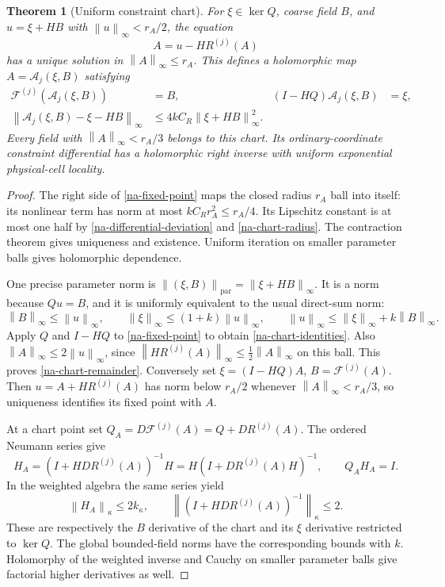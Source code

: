 \documentclass[11pt]{article}
\newtheorem{theorem}{Theorem}[section]
\theoremstyle{remark}
\newcommand{\norm}[1]{\left\|#1\right\|}
\begin{document}
\begin{theorem}[Uniform constraint chart]
\label{na-chart-theorem}
For $\xi\in\ker Q$, coarse field $B$, and
$u=\xi+HB$ with $\norm{u}_\infty<r_A/2$, the equation
\begin{equation}
 A=u-HR^{(j)}(A)
 \label{na-fixed-point}
\end{equation}
has a unique solution in $\norm{A}_\infty\le r_A$. This defines
a holomorphic map $A=\mathcal A_j(\xi,B)$ satisfying
\begin{align}
 \mathcal F^{(j)}(\mathcal A_j(\xi,B))&=B,
 & (I-HQ)\mathcal A_j(\xi,B)&=\xi,
 \label{na-chart-identities}\\
 \norm{\mathcal A_j(\xi,B)-\xi-HB}_\infty
   &\le4kC_R\norm{\xi+HB}_\infty^2.
 \label{na-chart-remainder}
\end{align}
Every field with $\norm{A}_\infty<r_A/3$ belongs to this chart.
Its ordinary-coordinate constraint differential has a holomorphic
right inverse with uniform exponential physical-cell locality.
\end{theorem}

\begin{proof}
The right side of \eqref{na-fixed-point} maps the closed radius
$r_A$ ball into itself: its nonlinear term has norm at most
$kC_Rr_A^2\le r_A/4$. Its Lipschitz constant is at most one half
by \eqref{na-differential-deviation} and \eqref{na-chart-radius}.
The contraction theorem gives uniqueness and existence. Uniform
iteration on smaller parameter balls gives holomorphic dependence.

One precise parameter norm is
$\norm{(\xi,B)}_{\mathrm{par}}=\norm{\xi+HB}_\infty$.
It is a norm because $Qu=B$, and it is uniformly equivalent to
the usual direct-sum norm:
\[
 \norm{B}_\infty\le\norm{u}_\infty,\qquad
 \norm{\xi}_\infty\le(1+k)\norm{u}_\infty,\qquad
 \norm{u}_\infty\le\norm{\xi}_\infty+k\norm{B}_\infty.
\]
Apply $Q$ and $I-HQ$ to \eqref{na-fixed-point} to obtain
\eqref{na-chart-identities}. Also
$\norm{A}_\infty\le2\norm{u}_\infty$, since
$\norm{HR^{(j)}(A)}_\infty\le\frac12\norm{A}_\infty$ on this
ball. This proves \eqref{na-chart-remainder}. Conversely set
$\xi=(I-HQ)A$, $B=\mathcal F^{(j)}(A)$. Then
$u=A+HR^{(j)}(A)$ has norm below $r_A/2$ whenever
$\norm{A}_\infty<r_A/3$, so uniqueness identifies its fixed point
with $A$.

At a chart point set
$Q_A=D\mathcal F^{(j)}(A)=Q+DR^{(j)}(A)$. The ordered Neumann
series give
\begin{equation}
 H_A=(I+H DR^{(j)}(A))^{-1}H
      =H(I+DR^{(j)}(A)H)^{-1},\qquad Q_AH_A=I.
 \label{na-chart-right-inverse}
\end{equation}
In the weighted algebra the same series yield
\begin{equation}
 \norm{H_A}_\kappa\le2k_\kappa,
 \qquad \norm{(I+H DR^{(j)}(A))^{-1}}_\kappa\le2.
 \label{na-chart-weighted}
\end{equation}
These are respectively the $B$ derivative of the chart and its
$\xi$ derivative restricted to $\ker Q$. The global bounded-field
norms have the corresponding bounds with $k$. Holomorphy of the
weighted inverse and Cauchy on smaller parameter balls give
factorial higher derivatives as well.
\end{proof}
\end{document}
